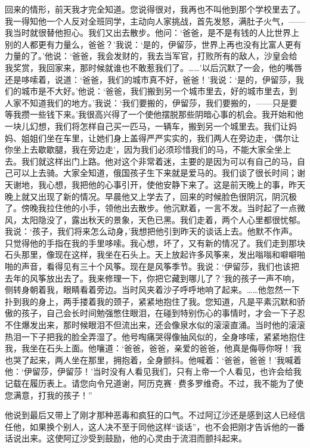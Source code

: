 回来的情形，前天我才完全知道。您说得很对，我再也不叫他到那个学校里去了。我一得知他一个人反对全班同学，主动向人家挑战，首先发怒，满肚子火气，——我当时就很替他担心。我们又出去散步。他问：‘爸爸，是不是有钱的人比世界上别的人都更有力量么，爸爸？’我说：‘是的，伊留莎，世界上再也没有比富人更有力量的了。’他说：‘爸爸，我会发财的，我去当军官，打败所有的敌人，沙皇会给我奖赏，我回家来，那时候就谁也不敢惹我们了。……’以后沉默了一会，他的嘴唇还是哆嗦着，说道：‘爸爸，我们的城市真不好，爸爸！’我说：‘是的，伊留莎，我们的城市是不大好。’他说：‘爸爸，我们搬到另一个城市里去，好的城市里去，到人家不知道我们的地方。’我说：‘我们要搬的，伊留莎，我们要搬的，——只是要等我攒一些钱下来。’我很高兴得了一个使他摆脱那些阴暗心事的机会。我开始和他一块儿幻想，我们将怎样自己买一匹马，一辆车，搬到另一个城里去。我们让妈妈、姐姐们坐在车里，让她们身上盖得严严实实的，我们两人在旁边走，‘偶尔让你坐上去歇歇腿，我在旁边走’，因为我们必须珍惜我们的马，不能大家全坐上去。我们就这样出门上路。他对这个非常着迷，主要的是因为可以有自己的马，自己可以上去骑。大家全知道，俄国孩子生下来就是爱马的。我们谈了很长时间；谢天谢地，我心想，我把他的心事引开，使他安静下来了。这是前天晚上的事，昨天晚上就又出现了新的情况。早晨他又上学去了，回来的时候脸色很阴沉，阴沉极了。傍晚我拉住他的小手，领他出去散步。他沉默着，一言不发。当时起了一点微风，太阳隐没了，露出秋天的景象，天色已黑。我们走着，两个人心里都很忧郁。我说：‘孩子，我们将来怎么动身，’我想把他引到昨天的谈话上去。他默不作声。只觉得他的手指在我的手里哆嗦。我心想，坏了，又有新的情况了。我们走到那块石头那里，像现在这样，我坐在石头上。天上放起许多风筝来，发出嗡嗡和噼噼啪啪的声音，看得见有三十个风筝。现在是风筝季节。我说：‘伊留莎，我们也该把去年的风筝放出去了。我来修理一下，你把它藏到哪儿了？’我的孩子一声不响，侧转身朝着我，眼睛看着旁边。当时风夹着沙子呼呼地响了起来。……他忽然一下扑到我的身上，两手搂着我的颈子，紧紧地抱住了我。您知道，凡是平素沉默和骄傲的孩子，自己会长时间勉强憋住眼泪，在碰到特别伤心的事情时，才会一下子忍不住爆发出来，那时候眼泪不但流出来，还会像泉水似的滚滚直涌。当时他的滚滚热泪一下子把我的脸全弄湿了。他号啕痛哭得像抽风似的，全身哆嗦，紧紧地抱住我，我坐在石头上面。他嚷道：‘爸爸，爸爸，亲爱的爸爸，他真是侮辱你呀！’我也哭了起来，两人坐在那里，拥抱着，全身颤抖。他喊着：‘爸爸，爸爸！’我喊着他：‘伊留莎，伊留莎！’当时没有人看见我们，只有上帝一个人看见，也许会给我记载在履历表上。请您向令兄道谢，阿历克赛·费多罗维奇。不过，我不能为了使您满意，打我的孩子！”
\par 他说到最后又带上了刚才那种恶毒和疯狂的口气。不过阿辽沙还是感到这人已经信任他，如果换个别人，这人决不至于同他这样“谈话”，也不会把刚才告诉他的一番话说出来。这使阿辽沙受到鼓励，他的心灵由于流泪而颤抖起来。
